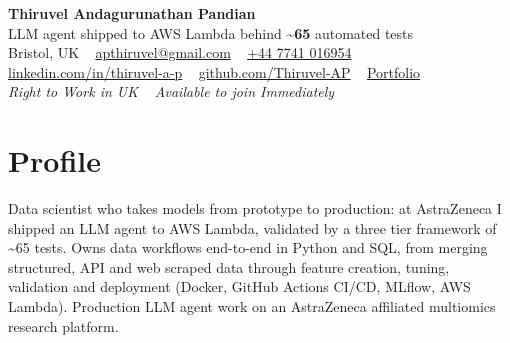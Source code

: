 \documentclass[a4paper,11pt]{article}
\newcommand{\num}[1]{\textbf{#1}}   %
\begin{document}
\begin{center}
  {\fontsize{22}{26}\selectfont\bfseries\color{navy} Thiruvel Andagurunathan Pandian}\\[4pt]
  {\fontsize{12}{14}\selectfont\color{navy} LLM agent shipped to AWS Lambda behind \num{\textasciitilde{}65} automated tests}\\[4pt]
  {\small
  Bristol, UK\nobreak\ \,\textperiodcentered\, \href{mailto:apthiruvel@gmail.com}{apthiruvel@gmail.com}\nobreak\ \,\textperiodcentered\, \href{tel:+447741016954}{+44 7741 016954}\nobreak\ \,\textperiodcentered\, \href{https://www.linkedin.com/in/thiruvel-a-p/}{linkedin.com/in/thiruvel-a-p}\nobreak\ \,\textperiodcentered\, \href{https://github.com/Thiruvel-AP}{github.com/Thiruvel-AP}\nobreak\ \,\textperiodcentered\, \href{https://thiruvel-ap.github.io/PersonalPortfolio/}{Portfolio}}\\[3pt]
  {\small\itshape\color{muted} Right to Work in UK\nobreak\ \,\textperiodcentered\, Available to join Immediately}

\end{center}

\section{Profile}
Data scientist who takes models from prototype to production: at AstraZeneca I shipped an LLM agent to AWS Lambda, validated by a three tier framework of \textasciitilde{}65 tests. Owns data workflows end-to-end in Python and SQL, from merging structured, API and web scraped data through feature creation, tuning, validation and deployment (Docker, GitHub Actions CI/CD, MLflow, AWS Lambda). Production LLM agent work on an AstraZeneca affiliated multiomics research platform.
\end{document}
